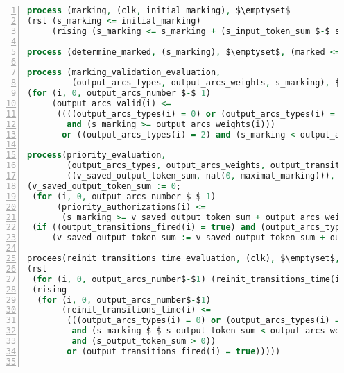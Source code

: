 \begin{lstlisting}[language=VHDL,label={lst:place-design-abss},caption={The \texttt{place} design in \hvhdl{} abstract syntax.},framexleftmargin=1.5em,xleftmargin=2em,numbers=left, numberstyle=\tiny\ttfamily]
process (marking, (clk, initial_marking), $\emptyset$
(rst (s_marking <= initial_marking)
     (rising (s_marking <= s_marking + (s_input_token_sum $-$ s_output_token_sum))))

process (determine_marked, (s_marking), $\emptyset$, (marked <= s_marking > 0))
  
process (marking_validation_evaluation, 
         (output_arcs_types, output_arcs_weights, s_marking), $\emptyset$,
(for (i, 0, output_arcs_number $-$ 1)
     (output_arcs_valid(i) <= 
      ((((output_arcs_types(i) = 0) or (output_arcs_types(i) = 1)) 
        and (s_marking >= output_arcs_weights(i))) 
       or ((output_arcs_types(i) = 2) and (s_marking < output_arcs_weights(i)))))))

process(priority_evaluation, 
        (output_arcs_types, output_arcs_weights, output_transitions_fired, s_marking),
        ((v_saved_output_token_sum, nat(0, maximal_marking))),
(v_saved_output_token_sum := 0;
 (for (i, 0, output_arcs_number $-$ 1)
      (priority_authorizations(i) <= 
       (s_marking >= v_saved_output_token_sum + output_arcs_weights(i))));
 (if ((output_transitions_fired(i) = true) and (output_arcs_types(i) = 0))
     (v_saved_output_token_sum := v_saved_output_token_sum + output_arcs_weights(i)))))
      
procees(reinit_transitions_time_evaluation, (clk), $\emptyset$,
(rst 
 (for (i, 0, output_arcs_number$-$1) (reinit_transitions_time(i) <= false))
 (rising 
  (for (i, 0, output_arcs_number$-$1)
       (reinit_transitions_time(i) <= 
        (((output_arcs_types(i) = 0) or (output_arcs_types(i) = 1))
         and (s_marking $-$ s_output_token_sum < output_arcs_weights(i))
         and (s_output_token_sum > 0))
        or (output_transitions_fired(i) = true)))))
     
\end{lstlisting}

